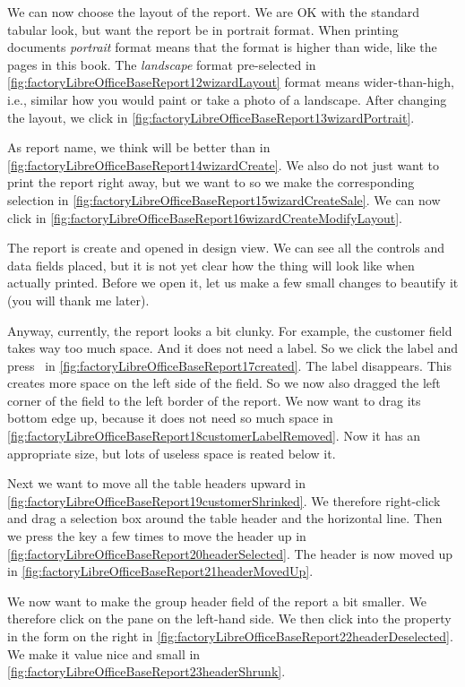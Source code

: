 We can now choose the layout of the report.
We are OK with the standard tabular look, but want the report be in portrait format.
When printing documents \emph{portrait} format means that the format is higher than wide, like the pages in this book.
The \emph{landscape} format pre-selected in \cref{fig:factoryLibreOfficeBaseReport12wizardLayout} format means wider-than-high, i.e., similar how you would paint or take a photo of a landscape.
After changing the layout, we click  in \cref{fig:factoryLibreOfficeBaseReport13wizardPortrait}.

As report name, we think  will be better than  in \cref{fig:factoryLibreOfficeBaseReport14wizardCreate}.
We also do not just want to print the report right away, but we want to  so we make the corresponding selection in \cref{fig:factoryLibreOfficeBaseReport15wizardCreateSale}.
We can now click  in \cref{fig:factoryLibreOfficeBaseReport16wizardCreateModifyLayout}.

The report is create and opened in design view.
We can see all the controls and data fields placed, but it is not yet clear how the thing will look like when actually printed.
Before we open it, let us make a few small changes to beautify it (you will thank me later).

Anyway, currently, the report looks a bit clunky.
For example, the customer field takes way too much space.
And it does not need a label.
So we click the label and press~\keys{\del} in \cref{fig:factoryLibreOfficeBaseReport17created}.
The label disappears.
This creates more space on the left side of the  field.
So we now also dragged the left corner of the  field to the left border of the report.
We now want to drag its bottom edge up, because it does not need so much space in \cref{fig:factoryLibreOfficeBaseReport18customerLabelRemoved}.
Now it has an appropriate size, but lots of useless space is reated below it.

Next we want to move all the table headers upward in \cref{fig:factoryLibreOfficeBaseReport19customerShrinked}.
We therefore right-click and drag a selection box around the table header and the horizontal line.
Then we press the \keys{\arrowkeyup} key a few times to move the header up in \cref{fig:factoryLibreOfficeBaseReport20headerSelected}.
The header is now moved up in \cref{fig:factoryLibreOfficeBaseReport21headerMovedUp}.

We now want to make the group header field of the report a bit smaller.
We therefore click on the  pane on the left-hand side.
We then click into the  property in the form on the right in \cref{fig:factoryLibreOfficeBaseReport22headerDeselected}.
We make it value nice and small in \cref{fig:factoryLibreOfficeBaseReport23headerShrunk}.


